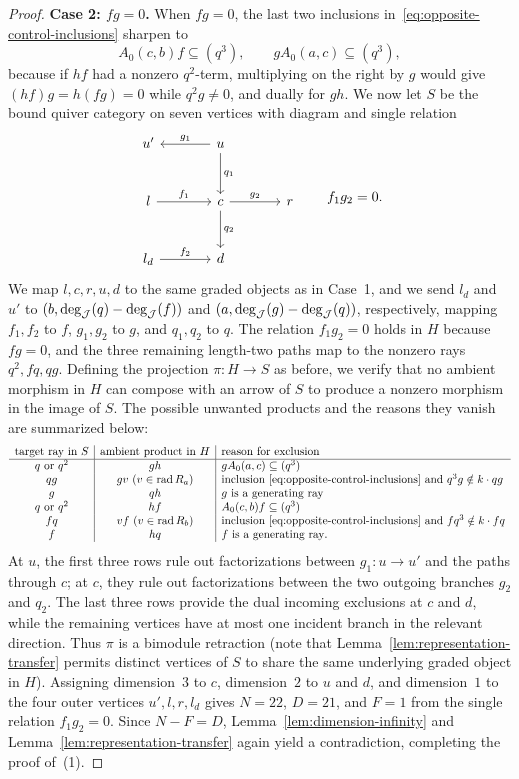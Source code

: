 \begin{proof}
\smallskip
\noindent\textbf{Case 2: $fg=0$.}
When $fg=0$, the last two inclusions in~\eqref{eq:opposite-control-inclusions} sharpen to
\[
  A_0(c,b)f\subseteq(q^3),\qquad gA_0(a,c)\subseteq(q^3),
\]
because if $hf$ had a nonzero $q^2$-term, multiplying on the right by $g$ would give $(hf)g=h(fg)=0$ while $q^2g\ne0$, and dually for $gh$. We now let $S$ be the bound quiver category on seven vertices with diagram and single relation
\[
\begin{tikzcd}[row sep=large,column sep=large]
u' & u\arrow[l,"g_1"']\arrow[d,"q_1"] & \\
l\arrow[r,"f_1"] & c\arrow[r,"g_2"]\arrow[d,"q_2"] & r \\
l_d\arrow[r,"f_2"] & d &
\end{tikzcd}
\qquad f_1g_2=0.
\]
We map $l,c,r,u,d$ to the same graded objects as in Case~1, and we send $l_d$ and $u'$ to $(b,\deg_\mathcal J(q)-\deg_\mathcal J(f))$ and $(a,\deg_\mathcal J(g)-\deg_\mathcal J(q))$, respectively, mapping $f_1,f_2$ to $f$, $g_1,g_2$ to $g$, and $q_1,q_2$ to $q$. The relation $f_1g_2=0$ holds in $H$ because $fg=0$, and the three remaining length-two paths map to the nonzero rays $q^2,fq,qg$. Defining the projection $\pi\colon H\to S$ as before, we verify that no ambient morphism in $H$ can compose with an arrow of $S$ to produce a nonzero morphism in the image of $S$. The possible unwanted products and the reasons they vanish are summarized below:
\[
  \begin{array}{c|c|l}
  \text{target ray in }S & \text{ambient product in }H & \text{reason for exclusion} \\ \hline
  q\text{ or }q^2 & gh & gA_0(a,c)\subseteq(q^3) \\
  qg & gv\ (v\in\operatorname{rad} R_a) & \text{inclusion~\eqref{eq:opposite-control-inclusions} and }q^3g\notin k\cdot qg \\
  g & qh & g\text{ is a generating ray} \\
  q\text{ or }q^2 & hf & A_0(c,b)f\subseteq(q^3) \\
  fq & vf\ (v\in\operatorname{rad} R_b) & \text{inclusion~\eqref{eq:opposite-control-inclusions} and }fq^3\notin k\cdot fq \\
  f & hq & f\text{ is a generating ray}.
  \end{array}
\]
At $u$, the first three rows rule out factorizations between $g_1\colon u\to u'$ and the paths through $c$; at $c$, they rule out factorizations between the two outgoing branches $g_2$ and $q_2$. The last three rows provide the dual incoming exclusions at $c$ and $d$, while the remaining vertices have at most one incident branch in the relevant direction. Thus $\pi$ is a bimodule retraction (note that Lemma~\ref{lem:representation-transfer} permits distinct vertices of $S$ to share the same underlying graded object in $H$). Assigning dimension~$3$ to $c$, dimension~$2$ to $u$ and $d$, and dimension~$1$ to the four outer vertices $u',l,r,l_d$ gives $N=22$, $D=21$, and $F=1$ from the single relation $f_1g_2=0$. Since $N-F=D$, Lemma~\ref{lem:dimension-infinity} and Lemma~\ref{lem:representation-transfer} again yield a contradiction, completing the proof of~(1).


\end{proof}
